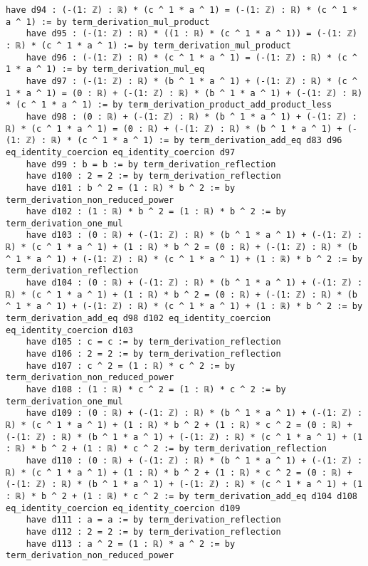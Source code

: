 \documentclass{article}
\begin{document}
\begin{tcolorbox}[colback=white!10, width=\linewidth]
\begin{lstlisting}[language=Lean4]
    have d94 : (-(1: ℤ) : ℝ) * (c ^ 1 * a ^ 1) = (-(1: ℤ) : ℝ) * (c ^ 1 * a ^ 1) := by term_derivation_mul_product
    have d95 : (-(1: ℤ) : ℝ) * ((1 : ℝ) * (c ^ 1 * a ^ 1)) = (-(1: ℤ) : ℝ) * (c ^ 1 * a ^ 1) := by term_derivation_mul_product
    have d96 : (-(1: ℤ) : ℝ) * (c ^ 1 * a ^ 1) = (-(1: ℤ) : ℝ) * (c ^ 1 * a ^ 1) := by term_derivation_mul_eq
    have d97 : (-(1: ℤ) : ℝ) * (b ^ 1 * a ^ 1) + (-(1: ℤ) : ℝ) * (c ^ 1 * a ^ 1) = (0 : ℝ) + (-(1: ℤ) : ℝ) * (b ^ 1 * a ^ 1) + (-(1: ℤ) : ℝ) * (c ^ 1 * a ^ 1) := by term_derivation_product_add_product_less
    have d98 : (0 : ℝ) + (-(1: ℤ) : ℝ) * (b ^ 1 * a ^ 1) + (-(1: ℤ) : ℝ) * (c ^ 1 * a ^ 1) = (0 : ℝ) + (-(1: ℤ) : ℝ) * (b ^ 1 * a ^ 1) + (-(1: ℤ) : ℝ) * (c ^ 1 * a ^ 1) := by term_derivation_add_eq d83 d96 eq_identity_coercion eq_identity_coercion d97
    have d99 : b = b := by term_derivation_reflection
    have d100 : 2 = 2 := by term_derivation_reflection
    have d101 : b ^ 2 = (1 : ℝ) * b ^ 2 := by term_derivation_non_reduced_power
    have d102 : (1 : ℝ) * b ^ 2 = (1 : ℝ) * b ^ 2 := by term_derivation_one_mul
    have d103 : (0 : ℝ) + (-(1: ℤ) : ℝ) * (b ^ 1 * a ^ 1) + (-(1: ℤ) : ℝ) * (c ^ 1 * a ^ 1) + (1 : ℝ) * b ^ 2 = (0 : ℝ) + (-(1: ℤ) : ℝ) * (b ^ 1 * a ^ 1) + (-(1: ℤ) : ℝ) * (c ^ 1 * a ^ 1) + (1 : ℝ) * b ^ 2 := by term_derivation_reflection
    have d104 : (0 : ℝ) + (-(1: ℤ) : ℝ) * (b ^ 1 * a ^ 1) + (-(1: ℤ) : ℝ) * (c ^ 1 * a ^ 1) + (1 : ℝ) * b ^ 2 = (0 : ℝ) + (-(1: ℤ) : ℝ) * (b ^ 1 * a ^ 1) + (-(1: ℤ) : ℝ) * (c ^ 1 * a ^ 1) + (1 : ℝ) * b ^ 2 := by term_derivation_add_eq d98 d102 eq_identity_coercion eq_identity_coercion d103
    have d105 : c = c := by term_derivation_reflection
    have d106 : 2 = 2 := by term_derivation_reflection
    have d107 : c ^ 2 = (1 : ℝ) * c ^ 2 := by term_derivation_non_reduced_power
    have d108 : (1 : ℝ) * c ^ 2 = (1 : ℝ) * c ^ 2 := by term_derivation_one_mul
    have d109 : (0 : ℝ) + (-(1: ℤ) : ℝ) * (b ^ 1 * a ^ 1) + (-(1: ℤ) : ℝ) * (c ^ 1 * a ^ 1) + (1 : ℝ) * b ^ 2 + (1 : ℝ) * c ^ 2 = (0 : ℝ) + (-(1: ℤ) : ℝ) * (b ^ 1 * a ^ 1) + (-(1: ℤ) : ℝ) * (c ^ 1 * a ^ 1) + (1 : ℝ) * b ^ 2 + (1 : ℝ) * c ^ 2 := by term_derivation_reflection
    have d110 : (0 : ℝ) + (-(1: ℤ) : ℝ) * (b ^ 1 * a ^ 1) + (-(1: ℤ) : ℝ) * (c ^ 1 * a ^ 1) + (1 : ℝ) * b ^ 2 + (1 : ℝ) * c ^ 2 = (0 : ℝ) + (-(1: ℤ) : ℝ) * (b ^ 1 * a ^ 1) + (-(1: ℤ) : ℝ) * (c ^ 1 * a ^ 1) + (1 : ℝ) * b ^ 2 + (1 : ℝ) * c ^ 2 := by term_derivation_add_eq d104 d108 eq_identity_coercion eq_identity_coercion d109
    have d111 : a = a := by term_derivation_reflection
    have d112 : 2 = 2 := by term_derivation_reflection
    have d113 : a ^ 2 = (1 : ℝ) * a ^ 2 := by term_derivation_non_reduced_power

\end{lstlisting}
\end{tcolorbox}
\end{document}
